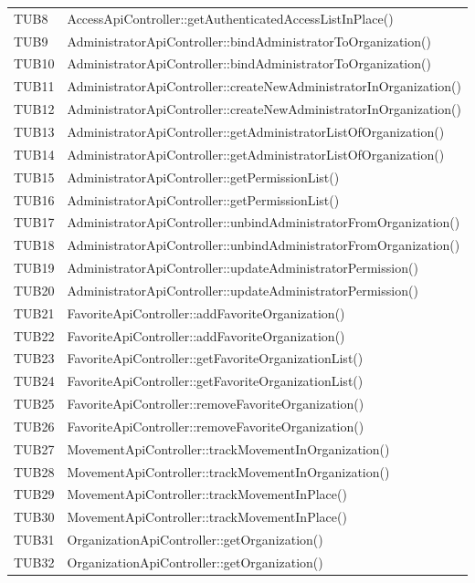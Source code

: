 {\begin{longtable}{C{2cm} C{12cm}}
		TUB8 & AccessApiController::getAuthenticatedAccessListInPlace()\\
		TUB9 & AdministratorApiController::bindAdministratorToOrganization()\\
		TUB10 & AdministratorApiController::bindAdministratorToOrganization()\\
		TUB11 & AdministratorApiController::createNewAdministratorInOrganization()\\
		TUB12 & AdministratorApiController::createNewAdministratorInOrganization()\\
		TUB13 & AdministratorApiController::getAdministratorListOfOrganization()\\
		TUB14 & AdministratorApiController::getAdministratorListOfOrganization()\\
		TUB15 & AdministratorApiController::getPermissionList()\\
		TUB16 & AdministratorApiController::getPermissionList()\\
		TUB17 & AdministratorApiController::unbindAdministratorFromOrganization()\\
		TUB18 & AdministratorApiController::unbindAdministratorFromOrganization()\\
		TUB19 & AdministratorApiController::updateAdministratorPermission()\\
		TUB20 & AdministratorApiController::updateAdministratorPermission()\\
		TUB21 & FavoriteApiController::addFavoriteOrganization()\\
		TUB22 & FavoriteApiController::addFavoriteOrganization()\\
		TUB23 & FavoriteApiController::getFavoriteOrganizationList()\\
		TUB24 & FavoriteApiController::getFavoriteOrganizationList()\\
		TUB25 & FavoriteApiController::removeFavoriteOrganization()\\
		TUB26 & FavoriteApiController::removeFavoriteOrganization()\\
		TUB27 & MovementApiController::trackMovementInOrganization()\\
		TUB28 & MovementApiController::trackMovementInOrganization()\\
		TUB29 & MovementApiController::trackMovementInPlace()\\
		TUB30 & MovementApiController::trackMovementInPlace()\\
		TUB31 & OrganizationApiController::getOrganization()\\
		TUB32 & OrganizationApiController::getOrganization()\\

\end{longtable}}
